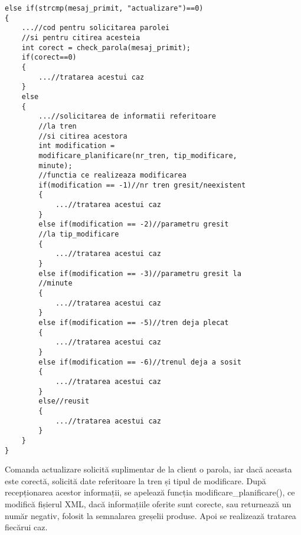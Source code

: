 \documentclass[runningheads]{llncs}
\begin{document}
\begin{verbatim}
else if(strcmp(mesaj_primit, "actualizare")==0)
{
    ...//cod pentru solicitarea parolei
    //si pentru citirea acesteia
    int corect = check_parola(mesaj_primit);
    if(corect==0)
    {
        ...//tratarea acestui caz
    }
    else
    {
        ...//solicitarea de informatii referitoare 
        //la tren
        //si citirea acestora
        int modification = 
        modificare_planificare(nr_tren, tip_modificare, 
        minute);
        //functia ce realizeaza modificarea
        if(modification == -1)//nr tren gresit/neexistent
        {
            ...//tratarea acestui caz
        }
        else if(modification == -2)//parametru gresit 
        //la tip_modificare
        {
            ...//tratarea acestui caz
        }
        else if(modification == -3)//parametru gresit la 
        //minute
        {
            ...//tratarea acestui caz
        }
        else if(modification == -5)//tren deja plecat
        {
            ...//tratarea acestui caz
        }
        else if(modification == -6)//trenul deja a sosit
        {
            ...//tratarea acestui caz
        }
        else//reusit
        {
            ...//tratarea acestui caz
        }
    }
}
\end{verbatim}
Comanda actualizare solicită suplimentar de la client o parola, iar dacă aceasta este corectă, solicită date referitoare la tren și tipul de modificare. După recepționarea acestor informații, se apelează funcția modificare\_planificare(), ce modifică fișierul XML, dacă informațiile oferite sunt corecte, sau returnează un număr negativ, folosit la semnalarea greșelii produse. Apoi se realizează tratarea fiecărui caz.
\end{document}

